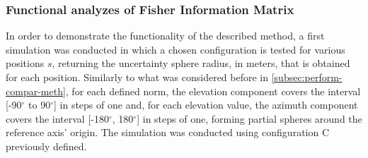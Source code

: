 \begin{table}[!htbp] %
	\begin{center}
		\caption{Obtained errors for configurations A,B and C using a plane wavefront estimator}
		\label{tab:planewave-estimator-abc}
	\end{center}
\end{table}




\subsubsection{Functional analyzes of Fisher Information Matrix}

In order to demonstrate the functionality of the described method, a first simulation was conducted in which a chosen configuration is tested for various positions $s$, returning the uncertainty sphere radius, in meters, that is obtained for each position. Similarly to what was considered before in \ref{subsec:perform-compar-meth}, for each defined norm, the elevation component covers the interval [-90$^{\circ}$ to 90$^{\circ}$] in steps of one and, for each elevation value, the azimuth component covers the interval [-180$^{\circ}$, 180$^{\circ}$] in steps of one, forming partial spheres around the reference axis' origin. The simulation was conducted using configuration C previously defined.

